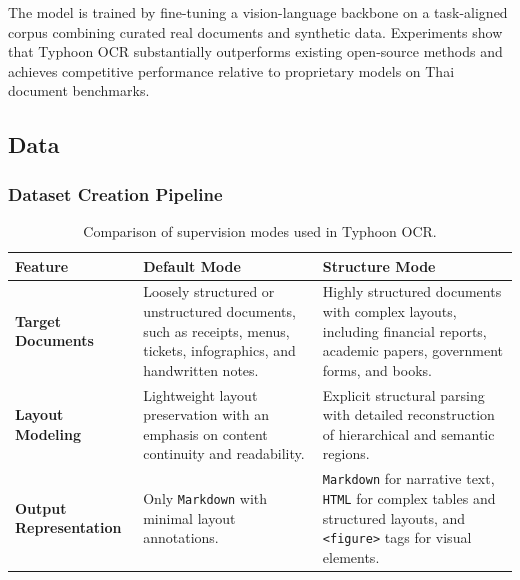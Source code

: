 \documentclass[]{typhoon} %
\begin{document}
The model is trained by fine-tuning a vision-language backbone on a task-aligned corpus combining curated real documents and synthetic data. Experiments show that Typhoon OCR substantially outperforms existing open-source methods and achieves competitive performance relative to proprietary models on Thai document benchmarks.


\subsection{Data}
\subsubsection{Dataset Creation Pipeline}
\begin{table}[h]
\centering
\begin{tabular}{@{}p{4cm}p{5.5cm}p{5.5cm}@{}}
\toprule
\textbf{Feature} & \textbf{Default Mode} & \textbf{Structure Mode} \\
\midrule
\textbf{Target Documents} &
Loosely structured or unstructured documents, such as receipts, menus, tickets, infographics, and handwritten notes. &
Highly structured documents with complex layouts, including financial reports, academic papers, government forms, and books. \\
\midrule
\textbf{Layout Modeling} &
Lightweight layout preservation with an emphasis on content continuity and readability. &
Explicit structural parsing with detailed reconstruction of hierarchical and semantic regions. \\
\midrule
\textbf{Output Representation} &
Only \texttt{Markdown} with minimal layout annotations. &
\texttt{Markdown} for narrative text, \texttt{HTML} for complex tables and structured layouts, and \texttt{<figure>} tags for visual elements. \\
\bottomrule
\end{tabular}
\caption{Comparison of supervision modes used in Typhoon OCR.}
\label{tab:modes-comparison}
\end{table}
\end{document}
